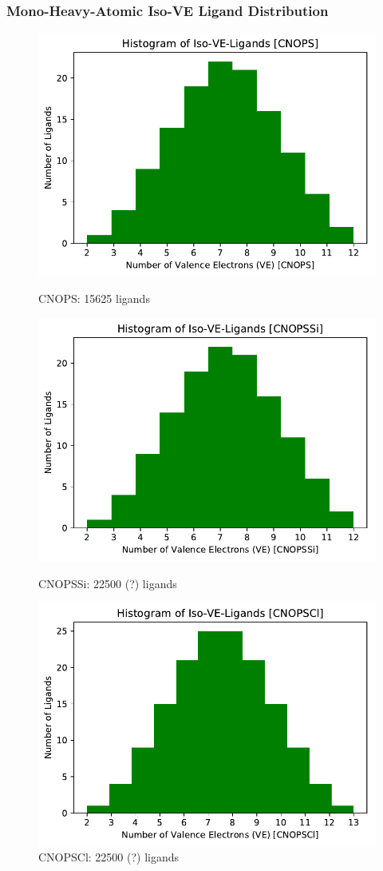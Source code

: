 \documentclass{beamer}
\begin{document}
\begin{frame}
\frametitle{Mono-Heavy-Atomic Iso-VE Ligand Distribution}
\begin{figure}[ht] 
	\label{ fig7} 
	\begin{minipage}[b]{0.5\linewidth}
		\centering
		\includegraphics[width=.5\linewidth]{img/hist_isove_ligands_CNOPS.pdf} 
		\caption{CNOPS: 15625 ligands} 
		\vspace{4ex}
	\end{minipage}%
	\begin{minipage}[b]{0.5\linewidth}
		\centering
		\includegraphics[width=.5\linewidth]{img/hist_isove_ligands_CNOPSSi.pdf} 
		\caption{CNOPSSi: 22500 (?) ligands} 
		\vspace{4ex}
	\end{minipage} 
	\begin{minipage}[b]{0.5\linewidth}
		\centering
		\includegraphics[width=.5\linewidth]{img/hist_isove_ligands_CNOPSCl.pdf} 
		\caption{CNOPSCl: 22500 (?) ligands} 
		\vspace{4ex}
	\end{minipage}%
	\begin{minipage}[b]{0.5\linewidth}

\end{minipage}
\end{figure}
\end{frame}
\end{document}
